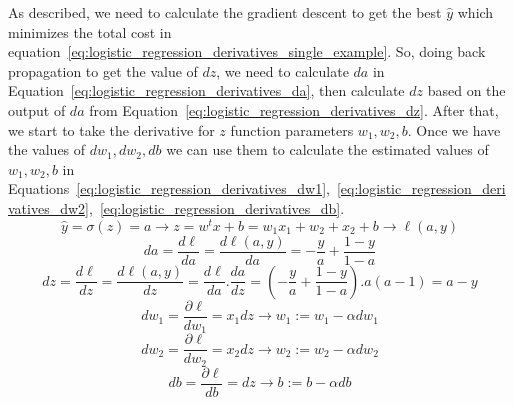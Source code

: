 As described, we need to calculate the gradient descent to get the best $\widehat{y}$ which minimizes the total cost in equation~\eqref{eq:logistic_regression_derivatives_single_example}. So, doing back propagation to get the value of $dz$, we need to calculate $da$ in Equation~\eqref{eq:logistic_regression_derivatives_da}, then calculate $dz$ based on the output of $da$ from Equation~\eqref{eq:logistic_regression_derivatives_dz}. After that, we start to take the derivative for $z$ function parameters \textbf{\textit{$w_1,w_2,b$}}. Once we have the values of \textbf{\textit{$dw_1,dw_2,db$}} we can use them to calculate the estimated values of \textbf{\textit{$w_1,w_2,b$}} in Equations~\eqref{eq:logistic_regression_derivatives_dw1},~\eqref{eq:logistic_regression_derivatives_dw2},~\eqref{eq:logistic_regression_derivatives_db}.%
%
\begin{equation}\label{eq:logistic_regression_derivatives_single_example}
  \boxed{\widehat{y} = \sigma(z) = a} \longrightarrow \boxed{ z = w^tx + b = w_1x_1+ w_2+x_2+ b} \longrightarrow \boxed{\ell(a,y)}
 \end{equation}
 \begin{equation}\label{eq:logistic_regression_derivatives_da}
   \boxed{da = \frac{d\ell}{da} = \frac{d\ell(a,y)}{da} = - \frac{y}{a} + \frac{1-y}{1-a}}
 \end{equation}
  \begin{equation}\label{eq:logistic_regression_derivatives_dz}
  \boxed{dz = \frac{d\ell}{dz} = \frac{d\ell(a,y)}{dz} = \frac{d\ell}{da} . \frac{da}{dz}} = \boxed{(- \frac{y}{a} + \frac{1-y}{1-a}) . a(a-1) } = \boxed{ a - y  }
 \end{equation}
 \begin{equation}\label{eq:logistic_regression_derivatives_dw1}
   \boxed{dw_1 = \frac{\partial\ell}{dw_1} = x_1 dz} \longrightarrow \boxed{ w_1 := w_1 - \alpha dw_1}
 \end{equation}
  \begin{equation}\label{eq:logistic_regression_derivatives_dw2}
  \boxed{dw_2 = \frac{\partial\ell}{dw_2} = x_2 dz} \longrightarrow \boxed{ w_2 := w_2 - \alpha dw_2}
 \end{equation}
 \begin{equation}\label{eq:logistic_regression_derivatives_db}
  \boxed{db = \frac{\partial\ell}{db} = dz} \longrightarrow \boxed{ b := b - \alpha db}
\end{equation}%
%
